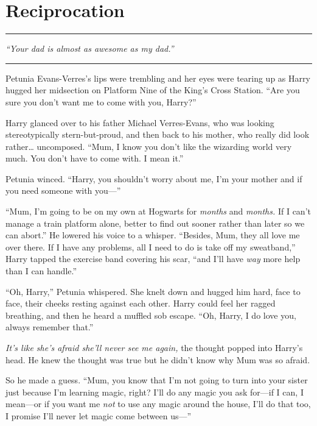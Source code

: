 \chapter{Reciprocation}\label{reciprocation}

\begin{center}\rule{3in}{0.4pt}\end{center}

\emph{``Your dad is almost as awesome as my dad.''}

\begin{center}\rule{3in}{0.4pt}\end{center}

Petunia Evans-Verres's lips were trembling and her eyes were tearing up
as Harry hugged her midsection on Platform Nine of the King's Cross
Station. ``Are you sure you don't want me to come with you, Harry?''

Harry glanced over to his father Michael Verres-Evans, who was looking
stereotypically stern-but-proud, and then back to his mother, who really
did look rather\ldots{} uncomposed. ``Mum, I know you don't like the
wizarding world very much. You don't have to come with. I mean it.''

Petunia winced. ``Harry, you shouldn't worry about me, I'm your mother
and if you need someone with you---''

``Mum, I'm going to be on my own at Hogwarts for \emph{months} and
\emph{months.} If I can't manage a train platform alone, better to find
out sooner rather than later so we can abort.'' He lowered his voice to
a whisper. ``Besides, Mum, they all love me over there. If I have any
problems, all I need to do is take off my sweatband,'' Harry tapped the
exercise band covering his scar, ``and I'll have \emph{way} more help
than I can handle.''

``Oh, Harry,'' Petunia whispered. She knelt down and hugged him hard,
face to face, their cheeks resting against each other. Harry could feel
her ragged breathing, and then he heard a muffled sob escape. ``Oh,
Harry, I do love you, always remember that.''

\emph{It's like she's afraid she'll never see me again,} the thought
popped into Harry's head. He knew the thought was true but he didn't
know why Mum was so afraid.

So he made a guess. ``Mum, you know that I'm not going to turn into your
sister just because I'm learning magic, right? I'll do any magic you ask
for---if I can, I mean---or if you want me \emph{not} to use any magic
around the house, I'll do that too, I promise I'll never let magic come
between us---''

